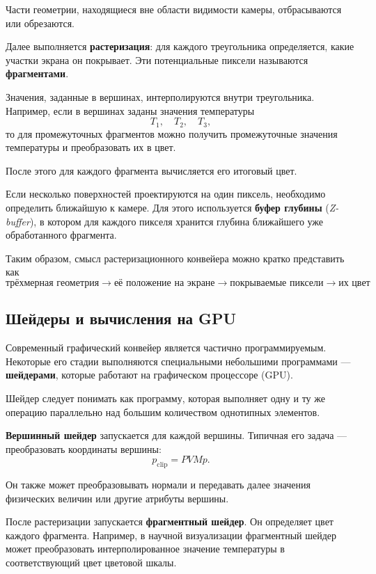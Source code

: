 Части геометрии, находящиеся вне области видимости камеры, отбрасываются или обрезаются.

Далее выполняется \textbf{растеризация}: для каждого треугольника определяется, какие участки экрана он покрывает. Эти потенциальные пиксели называются \textbf{фрагментами}.

Значения, заданные в вершинах, интерполируются внутри треугольника. Например, если в вершинах заданы значения температуры
\[
T_1,\quad T_2,\quad T_3,
\]
то для промежуточных фрагментов можно получить промежуточные значения температуры и преобразовать их в цвет.

После этого для каждого фрагмента вычисляется его итоговый цвет.

Если несколько поверхностей проектируются на один пиксель, необходимо определить ближайшую к камере. Для этого используется \textbf{буфер глубины} (\textit{Z-buffer}), в котором для каждого пикселя хранится глубина ближайшего уже обработанного фрагмента.

Таким образом, смысл растеризационного конвейера можно кратко представить как
\[
\boxed{
	\text{трёхмерная геометрия}
	\rightarrow
	\text{её положение на экране}
	\rightarrow
	\text{покрываемые пиксели}
	\rightarrow
	\text{их цвет}
}.
\]

\subsection{Шейдеры и вычисления на GPU}

Современный графический конвейер является частично программируемым. Некоторые его стадии выполняются специальными небольшими программами --- \textbf{шейдерами}, которые работают на графическом процессоре (GPU).

Шейдер следует понимать как программу, которая выполняет одну и ту же операцию параллельно над большим количеством однотипных элементов.

\textbf{Вершинный шейдер} запускается для каждой вершины. Типичная его задача --- преобразовать координаты вершины:
\[
p_{\mathrm{clip}}=PVMp.
\]

Он также может преобразовывать нормали и передавать далее значения физических величин или другие атрибуты вершины.

После растеризации запускается \textbf{фрагментный шейдер}. Он определяет цвет каждого фрагмента. Например, в научной визуализации фрагментный шейдер может преобразовать интерполированное значение температуры в соответствующий цвет цветовой шкалы.

